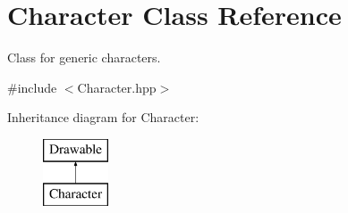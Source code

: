 \hypertarget{class_character}{}\section{Character Class Reference}
\label{class_character}


Class for generic characters.  




{\ttfamily \#include $<$Character.\+hpp$>$}

Inheritance diagram for Character\+:\begin{figure}[H]
\begin{center}
\leavevmode
\includegraphics[height=2.000000cm]{class_character}
\end{center}
\end{figure}
